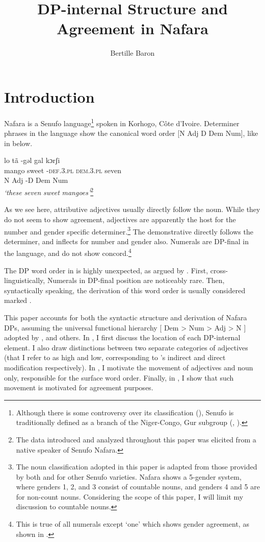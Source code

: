 \documentclass[output=paper]{langscibook}
\author{Bertille Baron\affiliation{Georgetown University}}
\title{DP-internal Structure and Agreement in Nafara}
\begin{document}
  

\section{Introduction}

Nafara is a Senufo language\footnote{Although there is some controversy over its classification (\citealt{Manessy1975,Naden1989}), Senufo is traditionally defined as a branch of the Niger-Congo, Gur subgroup (\citealt{Westermann1970}, \citealt{BendorSamuel1971}).} spoken in Korhogo, Côte d’Ivoire. Determiner phrases in the language show the canonical word order [N Adj D Dem Num], like in  below. 


\ea
\glll lo  tã -gəl  gal kɔrʃi \label{ex:baron:1}\\
      mango sweet -\textsc{def.3.pl} \textsc{dem.3.pl} seven\\
      N Adj -D Dem Num\\
\glt \textit{‘these} \textit{seven} \textit{sweet} \textit{mangoes’}\footnote{The data introduced and analyzed throughout this paper was elicited from a native speaker of Senufo Nafara.}
\z

As we see here, attributive adjectives usually directly follow the noun. While they do not seem to show agreement, adjectives are apparently the host for the number and gender specific determiner.\footnote{The noun classification adopted in this paper is adapted from those provided by both \citet[22]{Manessy1996} and \citet[76]{Carlson1990} for other Senufo varieties. Nafara shows a 5-gender system, where genders 1, 2, and 3 consist of countable nouns, and genders 4 and 5 are for non-count nouns. Considering the scope of this paper, I will limit my discussion to countable nouns.} The demonstrative directly follows the determiner, and inflects for number and gender also. Numerals are DP-final in the language, and do not show concord.\footnote{This is true of all numerals except ‘one’ which shows gender agreement, as shown in .}

The DP word order in  is highly unexpected, as argued by \citet{Cinque2005}. First, cross-linguistically, Numerals in DP-final position are noticeably rare. Then, syntactically speaking, the derivation of this word order is usually considered marked \citep{Cinque2005}.

This paper accounts for both the syntactic structure and derivation of Nafara DPs, assuming the universal functional hierarchy [ Dem > Num > Adj > N ] adopted by \citet{Greenberg1963}, \citet{Cinque2005} and others. In , I first discuss the location of each DP-internal element. I also draw distinctions between two separate categories of adjectives (that I refer to as high and low, corresponding to \citealt{Cinque2010}’s  indirect and direct modification respectively). In , I motivate the movement of adjectives and noun only, responsible for the surface word order. Finally, in , I show that such movement is motivated for agreement purposes.
\end{document}

